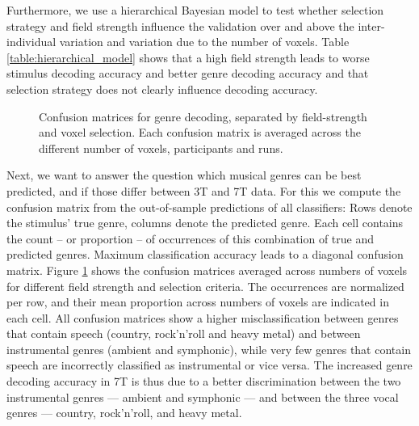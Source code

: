 Furthermore, we use a hierarchical Bayesian model to test whether selection strategy and field strength influence the validation over and above the inter-individual variation and variation due to the number of voxels.
Table \ref{table:hierarchical_model} shows that a high field strength leads to worse stimulus decoding accuracy and better genre decoding accuracy and that selection strategy does not clearly influence decoding accuracy.

\begin{figure}[!htb]
  \centering
  \caption{Confusion matrices for genre decoding, separated by field-strength and voxel selection. Each confusion matrix is averaged across the different number of voxels, participants and runs.}

 \label{fig:confusion_matrices}
\end{figure}


Next, we want to answer the question which musical genres can be best predicted, and if those differ between 3T and 7T data. For this we compute the confusion matrix from the out-of-sample predictions of all classifiers: Rows denote the stimulus' true genre, columns denote the predicted genre. Each cell contains the count -- or proportion -- of occurrences of this combination of true and predicted genres. Maximum classification accuracy leads to a diagonal confusion matrix.
Figure \ref{fig:confusion_matrices} shows the confusion matrices averaged across numbers of voxels for different field strength and selection criteria. The occurrences are normalized per row, and their mean proportion across numbers of voxels are indicated in each cell. All confusion matrices show a higher misclassification between genres that contain speech (country, rock'n'roll and heavy metal) and between instrumental genres (ambient and symphonic), while very few genres that contain speech are incorrectly classified as instrumental or vice versa. The increased genre decoding accuracy in 7T is thus due to a better discrimination between the two instrumental genres --- ambient and symphonic --- and between the three vocal genres --- country, rock'n'roll, and heavy metal.

